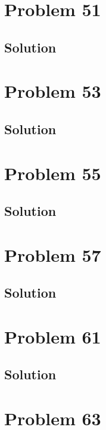 \documentclass[12pt]{article}
\begin{document}
    \pagebreak
    \section{Problem 51}

        \subsection{Solution}

    \pagebreak
    \section{Problem 53}

        \subsection{Solution}

    \pagebreak
    \section{Problem 55}

        \subsection{Solution}

    \pagebreak
    \section{Problem 57}

        \subsection{Solution}

    \pagebreak
    \section{Problem 61}

        \subsection{Solution}

    \pagebreak
    \section{Problem 63}
\end{document}
